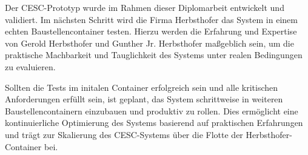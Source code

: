 Der CESC-Prototyp wurde im Rahmen dieser Diplomarbeit entwickelt und validiert. Im nächsten Schritt wird die Firma Herbsthofer das System in einem echten Baustellencontainer testen. Hierzu werden die Erfahrung und Expertise von Gerold Herbsthofer und Gunther Jr. Herbsthofer maßgeblich sein, um die praktische Machbarkeit und Tauglichkeit des Systems unter realen Bedingungen zu evaluieren.

Sollten die Tests im initalen Container erfolgreich sein und alle kritischen Anforderungen erfüllt sein, ist geplant, das System schrittweise in weiteren Baustellencontainern einzubauen und produktiv zu rollen. Dies ermöglicht eine kontinuierliche Optimierung des Systems basierend auf praktischen Erfahrungen und trägt zur Skalierung des CESC-Systems über die Flotte der Herbsthofer-Container bei.